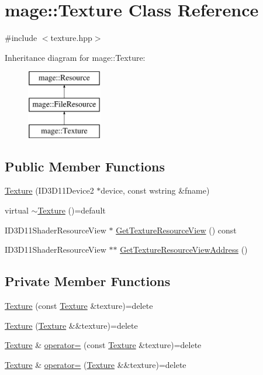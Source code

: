 \hypertarget{classmage_1_1_texture}{}\section{mage\+:\+:Texture Class Reference}
\label{classmage_1_1_texture}


{\ttfamily \#include $<$texture.\+hpp$>$}

Inheritance diagram for mage\+:\+:Texture\+:\begin{figure}[H]
\begin{center}
\leavevmode
\includegraphics[height=3.000000cm]{classmage_1_1_texture}
\end{center}
\end{figure}
\subsection*{Public Member Functions}
\begin{DoxyCompactItemize}
\item 
\hyperlink{classmage_1_1_texture_a680c4df56476b4c66c1e2ffd5bef63c2}{Texture} (I\+D3\+D11\+Device2 $\ast$device, const wstring \&fname)
\item 
virtual \hyperlink{classmage_1_1_texture_a81664804ac0259e8c67851409ee106fa}{$\sim$\+Texture} ()=default
\item 
I\+D3\+D11\+Shader\+Resource\+View $\ast$ \hyperlink{classmage_1_1_texture_a8b04efb947c49819642f86c8a16f813b}{Get\+Texture\+Resource\+View} () const
\item 
I\+D3\+D11\+Shader\+Resource\+View $\ast$$\ast$ \hyperlink{classmage_1_1_texture_a322ee2751dbd9ccfb245c6d481dfc803}{Get\+Texture\+Resource\+View\+Address} ()
\end{DoxyCompactItemize}
\subsection*{Private Member Functions}
\begin{DoxyCompactItemize}
\item 
\hyperlink{classmage_1_1_texture_aed9e8ab5bc3efdeb381672fd4e243ea7}{Texture} (const \hyperlink{classmage_1_1_texture}{Texture} \&texture)=delete
\item 
\hyperlink{classmage_1_1_texture_ac1381892e58871e56498f537092f827f}{Texture} (\hyperlink{classmage_1_1_texture}{Texture} \&\&texture)=delete
\item 
\hyperlink{classmage_1_1_texture}{Texture} \& \hyperlink{classmage_1_1_texture_a0b73b4df98d729c8f60e58b0ca065636}{operator=} (const \hyperlink{classmage_1_1_texture}{Texture} \&texture)=delete
\item 
\hyperlink{classmage_1_1_texture}{Texture} \& \hyperlink{classmage_1_1_texture_a765e9cf3bddedbe2795dea0fe57245ff}{operator=} (\hyperlink{classmage_1_1_texture}{Texture} \&\&texture)=delete
\end{DoxyCompactItemize}

